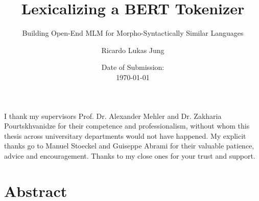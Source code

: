 \documentclass[12pt, a4paper, english]{ttlab-qualify}
\begin{document}
    \titlehead{
        Ricardo Lukas Jung\\
        6227492\\
        Empirische Sprachwissenschaft (B.A.)\\
        Phonetik \& Digital Humanities \\
        15\textsuperscript{th} Semester\\
        s2458588@stud.uni-frankfurt.de
    }
    \subject{Bachelor Thesis}
    \author{Ricardo Lukas Jung}
    \title{Lexicalizing a BERT Tokenizer}
    \subtitle{Building Open-End MLM for Morpho-Syntactically Similar Languages}
    \date{Date of Submission: \\\today}
    \publishers{Text Technology Lab\\Prof. Dr. Alexander Mehler\\Dr. Zakharia Pourtskhvanidze}

    \maketitle

    \cleardoublepage
    \thispagestyle{empty}
    I thank my supervisors Prof. Dr. Alexander Mehler and Dr. Zakharia Pourtskhvanidze for their competence and professionalism, without whom this thesis across universitary departments would not have happened.
    My explicit thanks go to Manuel Stoeckel and Guiseppe Abrami for their valuable patience, advice and encouragement.
    Thanks to my close ones for your trust and support.

    \chapter*{Abstract}
    \thispagestyle{empty}
    



    \cleardoubleoddpage

    \tableofcontents
    \thispagestyle{empty}
    \newpage
    \listoffigures
    \setcounter{page}{1}
    \newpage
    \listoftables
    \newpage

\end{document}
